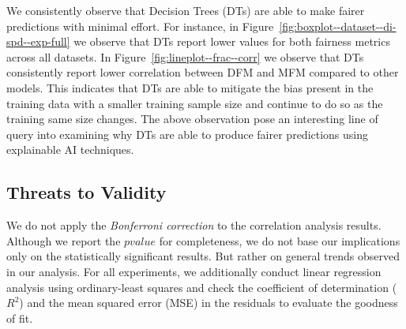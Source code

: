 \documentclass[sigconf,review,anonymous]{acmart}
\begin{document}
We consistently observe that Decision Trees (DTs) are able to make
fairer predictions with minimal effort. For instance, in
Figure \ref{fig:boxplot--dataset--di-spd--exp-full} we observe that
DTs report lower values for both fairness metrics across all
datasets. In Figure \ref{fig:lineplot--frac--corr} we observe that DTs
consistently report lower correlation between DFM and MFM compared to
other models. This indicates that DTs are able to mitigate the bias
present in the training data with a smaller training sample size and
continue to do so as the training same size changes. The above
observation pose an interesting line of query into examining why DTs
are able to produce fairer predictions using explainable AI
techniques.

\subsection{Threats to Validity}\label{sec:threats}

We do not apply the \emph{Bonferroni correction} to the correlation
analysis results. Although we report the $pvalue$ for completeness,
we do not base our implications only on the statistically significant
results. But rather on general trends observed in our analysis. For
all experiments, we additionally conduct linear regression analysis
using ordinary-least squares and check the coefficient of
determination ($R^2$) and the mean squared error (MSE) in the
residuals to evaluate the goodness of fit. 


\end{document}
